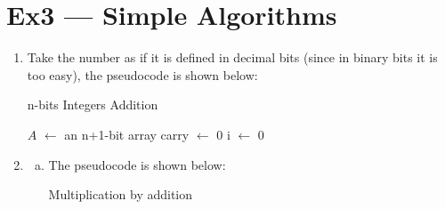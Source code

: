 \documentclass[12pt, a4paper]{article}
\begin{document}
\section*{Ex3 --- Simple Algorithms}
\begin{enumerate}
    \item Take the number as if it is defined in decimal bits (since in binary bits it is too easy), 
          the pseudocode is shown below:
          \begin{algorithm}[h!]
              \caption{n-bits Integers Addition}
              $A$ $\leftarrow$ an n+1-bit array\;
              carry $\leftarrow$ 0\;
              i $\leftarrow$ 0\;
              
              \;

          \end{algorithm}
    
    \item \begin{enumerate}[a)]
        \item The pseudocode is shown below: 
              \begin{algorithm}[h!]
                  \caption{Multiplication by addition}

                  
              \end{algorithm}
    \end{enumerate}
\end{enumerate}
\end{document}
